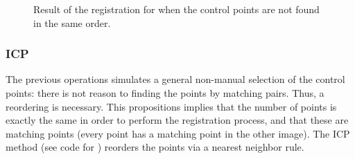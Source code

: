\begin{figure}[htbp]
\centering\caption{Result of the registration for when the control points are not found in the same order.}%
 \hspace*{1.5cm}
 \label{fig:registration:python:random}%
\end{figure}


\subsubsection{ICP}
The previous operations simulates a general non-manual selection of the control points: there is not reason to finding the points by matching pairs. Thus, a reordering is necessary. This propositions implies that the number of points is exactly the same in order to perform the registration process, and that these are matching points (every point has a matching point in the other image). The ICP method (see code for ) reorders the points via a nearest neighbor rule.

